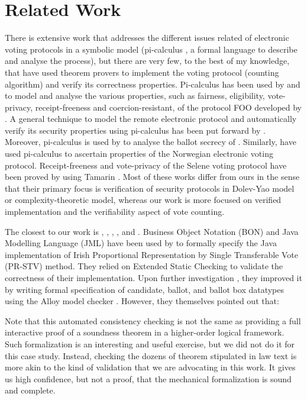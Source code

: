 \section{Related Work}
 There is extensive work that 
 addresses the different issues related of electronic voting protocols  in a symbolic model (pi-calculus  
 \citep{10.5555/329902} \citep{10.1145/373243.360213}, 
 a formal language to describe and analyse the process), 
 but there are very few, to the best of my knowledge, 
 that have used theorem provers to implement the voting protocol (counting algorithm)
 and verify its correctness properties.  Pi-calculus
 has been used by \citep{10.1007/978-3-540-31987-0_14} and  \citep{Delaune2010} 
 to model and analyse the various properties, such as fairness, eligibility, vote-privacy, receipt-freeness and 
 coercion-resistant,  of the protocol FOO developed by \citep{10.1007/3-540-57220-1_66}. 
 A general technique to model the remote electronic protocol 
 and automatically verify  its security properties using pi-calculus has been 
 put forward by \citep{Backes:2008:AVR:1380848.1381255}. Moreover, 
 pi-calculus is used by \citep{5992139} to analyse the ballot secrecy of \citep{Helios:2016:HVS}. 
 Similarly, \citep{10.1007/978-3-642-28641-4_7} have used pi-calculus to ascertain properties of 
 the Norwegian electronic voting protocol. 
 Receipt-freeness and vote-privacy of the Selene voting protocol \citep{Selene} have been 
 proved by \citep{10.1007/978-3-319-68687-5_7}  using Tamarin \citep{10.5555/2958031.2958047}.
 Most of these works differ from ours
 in the sense that their primary focus is verification of security protocols in  
 Dolev-Yao model or  complexity-theoretic model, whereas our work is 
 more focused on verified implementation and  the verifiability  aspect of vote counting.

 The closest to our work is \citep{Cochran:2010:VFS} \citep{DeYoung:2012:LLV}, \citep{Pattinson:2015:VCM}, \citep{Pattinson:2016:MSP},
 \citep{Verity:2017:FVI:3014812.3014845}, and \citep{Ghale:2017:FVS}.
 Business Object Notation (BON) and Java Modelling Language (JML)  have been used by \citep{Cochran:2010:VFS} to formally specify the
 Java implementation of  Irish Proportional  Representation  by  Single  Transferable  Vote  (PR-STV) 
 method.  They relied on Extended Static Checking to validate the correctness of their 
 implementation. Upon further investigation \citep{Cochran:2013:FMB}, they improved it 
 by writing formal specification of  candidate, ballot, and ballot box datatypes 
 using the Alloy model checker \citep{10.1145/505145.505149}. However, they themselves pointed out that:
 \begin{displayquote}
 Note that this automated consistency checking is not the same as providing a 
 full interactive proof of a soundness theorem in a higher-order logical framework.
 Such formalization is an interesting and useful exercise, but we did not do it for this 
 case study. Instead, checking the dozens of theorem stipulated in law text is more 
 akin to the kind of validation that we are advocating in this work. 
 It gives us high confidence, but not a proof, that the mechanical formalization is
  sound and complete.
  \end{displayquote}
 
